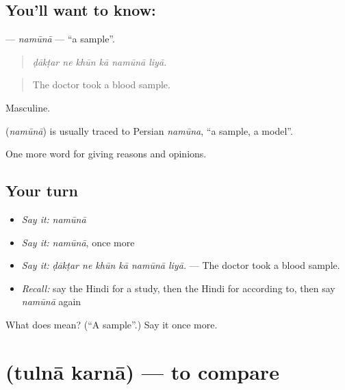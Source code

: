 \subsection*{You'll want to know: }
\textbf{} — \emph{namūnā} — \textquotedblleft{}a sample\textquotedblright{}.

\begin{quote}
     
\end{quote}

\begin{quote}
\emph{ḍākṭar ne khūn kā namūnā liyā.}
\end{quote}

\begin{quote}
The doctor took a blood sample.
\end{quote}

Masculine.

\begin{cousinweb}
\textbf{} (\emph{namūnā}) is usually traced to Persian \emph{namūna}, \textquotedblleft{}a sample, a model\textquotedblright{}.
\end{cousinweb}

\begin{grammarlens}[title={What you've built}]
One more word for giving reasons and opinions.
\end{grammarlens}

\subsection*{Your turn}
\begin{itemize}
\raggedright
  \item \emph{Say it:} \emph{namūnā}
  \item \emph{Say it:} \emph{namūnā}, once more
  \item \emph{Say it:} \emph{ḍākṭar ne khūn kā namūnā liyā.} — The doctor took a blood sample.
  \item \emph{Recall:} say the Hindi for a study, then the Hindi for according to, then say \emph{namūnā} again
\end{itemize}

\begin{tcolorbox}[breakable,colback=teal!4,colframe=teal!35!black,title={Before you move on}]
What does  mean? (\textquotedblleft{}A sample\textquotedblright{}.) Say it once more.
\end{tcolorbox}
\section[\texorpdfstring{\hi{तुलना} \hi{करना} (tulnā karnā)}{तुलना करना (tulnā karnā)}]{  (tulnā karnā) — to compare}

